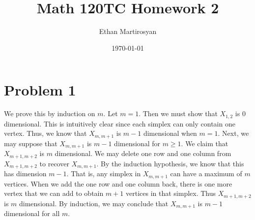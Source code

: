 \documentclass[12pt]{article}
\begin{document}
 
\title{Math 120TC Homework 2}
\author{Ethan Martirosyan}
\date{\today}
\maketitle
{}
\hfuzz=50pt
\section*{Problem 1}
We prove this by induction on $m$. Let $m = 1$. Then we must show that $X_{1,2}$ is $0$ dimensional. This is intuitively clear since each simplex can only contain one vertex. Thus, we know that $X_{m,m+1}$ is $m-1$ dimensional when $m = 1$. Next, we may suppose that $X_{m,m+1}$ is $m-1$ dimensional for $m\geq 1$. We claim that $X_{m+1,m+2}$ is $m$ dimensional. We may delete one row and one column from $X_{m+1,m+2}$ to recover $X_{m,m+1}$. By the induction hypothesis, we know that this has dimension $m-1$. That is, any simplex in $X_{m,m+1}$ can have a maximum of $m$ vertices. When we add the one row and one column back, there is one more vertex that we can add to obtain $m+1$ vertices in that simplex. Thus $X_{m+1,m+2}$ is $m$ dimensional. By induction, we may conclude that $X_{m,m+1}$ is $m-1$ dimensional for all $m$.
\newpage
\end{document}
